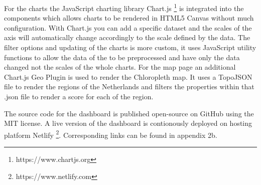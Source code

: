 For the charts the JavaScript charting library Chart.js \footnote{https://www.chartjs.org} is integrated into the components which allows charts to be rendered in HTML5 Canvas without much configuration. With Chart.js you can add a specific dataset and the scales of the axis will automatically change accordingly to the scale defined by the data. The filter options and updating of the charts is more custom, it uses JavaScript utility functions to allow the data of the to be preprocessed and have only the data changed not the scales of the whole charts. For the map page an additional Chart.js Geo Plugin is used to render the Chloropleth map. It uses a TopoJSON file to render the regions of the Netherlands and filters the properties within that .json file to render a score for each of the region.

The source code for the dashboard is published open-source on GitHub using the MIT license. A live version of the dashboard is contionously deployed on hosting platform Netlify \footnote{https://www.netlify.com}. Corresponding links can be found in appendix 2b.